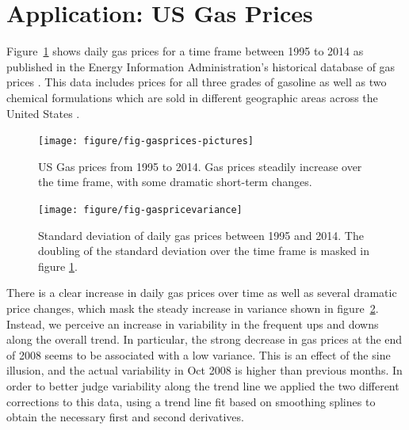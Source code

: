 \documentclass[12pt]{article}\usepackage[]{graphicx}\usepackage[]{color}
\newenvironment{knitrout}{}{} %
\begin{document}
\section{Application: US Gas Prices}
Figure~\ref{fig:gasprices} shows daily gas prices for a time frame between 1995 to 2014 as published in the Energy Information Administration's historical database of gas prices \citep{EIA}. This data includes prices for all three grades of gasoline as well as two chemical formulations which are sold in different geographic areas across the United States \citep{EIA-reformulated}. 

\begin{figure}
\begin{knitrout}
\color{fgcolor}

{\centering \texttt{[image: figure/fig-gasprices-pictures]} 

}



\end{knitrout}
\caption{US Gas prices from 1995 to 2014. Gas prices steadily increase over the time frame, with some dramatic short-term changes.}\label{fig:gasprices}
\end{figure}
\begin{figure}\centering
\caption{Standard deviation of daily gas prices between 1995 and 2014. The doubling of the standard deviation over the time frame is masked in figure \ref{fig:gasprices}.\label{fig:gasvariance}}
\begin{knitrout}
\color{fgcolor}

{\centering \texttt{[image: figure/fig-gaspricevariance]} 

}



\end{knitrout}
\end{figure}
There is a clear increase in daily gas prices over time as well as several dramatic price changes, which mask the steady increase in variance shown in figure~\ref{fig:gasvariance}. Instead, we perceive an increase in variability in the frequent ups and downs along the overall trend. In particular, the strong decrease in gas prices at the end of 2008 seems to be associated with a low variance. This is an effect of the sine illusion, and the actual variability in Oct 2008 is higher than previous months. In order to better judge variability along the trend line we applied the two different corrections to this data, using a trend line fit based on smoothing splines to obtain the necessary first and second derivatives.
\end{document}
